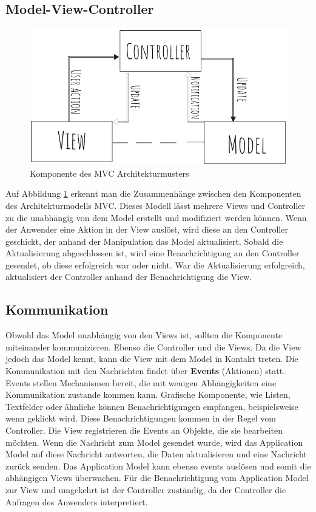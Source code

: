 \subsection*{Model-View-Controller}
\begin{figure}[h] 
\centering
\includegraphics[scale=0.4]{fig/mvc.png} 
\caption{Komponente des MVC Architekturmusters}
\label{fig:MVC}
\end{figure} 
Auf Abbildung \ref{fig:MVC} erkennt man die Zusammenh\"ange zwischen den Komponenten des Architekturmodells \ac{MVC}. Dieses Modell l\"asst mehrere Views und Controller zu die unabh\"angig von dem Model erstellt und modifiziert werden k\"onnen\cite{Curry2008}.
Wenn der Anwender eine Aktion in der View ausl\"ost, wird diese an den Controller geschickt, der anhand der Manipulation das Model aktualisiert. Sobald die Aktualisierung abgeschlossen ist, wird eine Benachrichtigung an den Controller gesendet, ob diese erfolgreich war oder nicht. War die Aktualisierung erfolgreich, aktualisiert der Controller anhand der Benachrichtigung die View.
\subsection*{Kommunikation}
Obwohl das Model unabh\"angig von den Views ist, sollten die Komponente miteinander kommunizieren. Ebenso die Controller und die Views. Da die View jedoch das Model kennt, kann die View mit dem Model in Kontakt treten. Die Kommunikation mit den Nachrichten findet \"uber \textbf{Events} (Aktionen) statt. Events stellen Mechanismen bereit, die mit wenigen Abh\"angigkeiten eine Kommunikation zustande kommen kann.
Grafische Komponente, wie Listen, Textfelder oder \"ahnliche k\"onnen Benachrichtigungen empfangen, beispielsweise wenn geklickt wird. Diese Benachrichtigungen kommen in der Regel vom Controller. Die View registrieren die Events an Objekte, die sie bearbeiten m\"ochten. Wenn die Nachricht zum Model gesendet wurde, wird das Application Model auf diese Nachricht antworten, die Daten aktualisieren und eine Nachricht zur\"uck senden. Das Application Model kann ebenso events ausl\"osen und somit die abh\"angigen Views \"uberwachen\cite{Deacon2005}. F\"ur die Benachrichtigung vom Application Model zur View und umgekehrt ist der Controller zust\"andig, da der Controller die Anfragen des Anwenders interpretiert.

